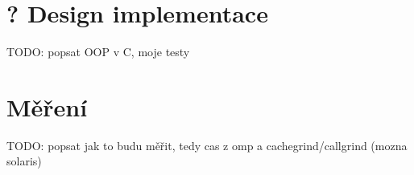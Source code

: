 \documentclass[thesis=B,czech]{FITthesis}[2012/06/26]
\begin{document}
\section{? Design implementace}

TODO: popsat OOP v C, moje testy

\section{Měření}

TODO: popsat jak to budu měřit, tedy cas z omp a cachegrind/callgrind (mozna solaris)










\begin{conclusion}
\end{conclusion}



\end{document}

